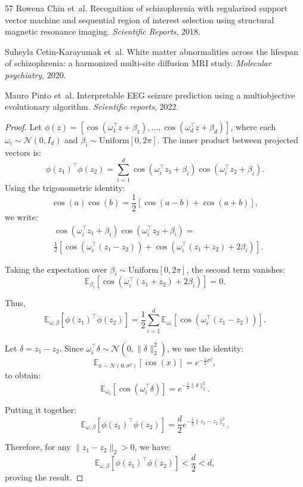 \documentclass{article}
\newtheorem{proof}{Proof}
\begin{document}
\begin{thebibliography}{57}
Rowena Chin et~al.
\newblock Recognition of schizophrenia with regularized support vector machine and sequential region of interest selection using structural magnetic resonance imaging.
\newblock \emph{Scientific Reports}, 2018.

Suheyla Cetin-Karayumak et~al.
\newblock White matter abnormalities across the lifespan of schizophrenia: a harmonized multi-site diffusion {MRI} study.
\newblock \emph{Molecular psychiatry}, 2020.

Mauro Pinto et~al.
\newblock Interpretable {EEG} seizure prediction using a multiobjective evolutionary algorithm.
\newblock \emph{Scientific reports}, 2022.

\end{thebibliography}

\normalsize


\clearpage
\newpage
\appendix

\begin{proof}
Let $\phi(z) = \left[ \cos(\omega_1^\top z + \beta_1), \dots, \cos(\omega_d^\top z + \beta_d) \right]$, where each $\omega_i \sim \mathcal{N}(0, I_d)$ and $\beta_i \sim \mathrm{Uniform}[0, 2\pi]$. The inner product between projected vectors is:
\[
\phi(z_1)^\top \phi(z_2) = \sum_{i=1}^d \cos(\omega_i^\top z_1 + \beta_i) \cos(\omega_i^\top z_2 + \beta_i).
\]
Using the trigonometric identity:
\[
\cos(a)\cos(b) = \frac{1}{2}[\cos(a - b) + \cos(a + b)],
\]
we write:
\begin{align*}
    &\cos(\omega_i^\top z_1 + \beta_i) \cos(\omega_i^\top z_2 + \beta_i) = \\
&\frac{1}{2} \left[ \cos(\omega_i^\top(z_1 - z_2)) + \cos(\omega_i^\top(z_1 + z_2) + 2\beta_i) \right].    
\end{align*}


Taking the expectation over $\beta_i \sim \mathrm{Uniform}[0, 2\pi]$, the second term vanishes:
\[
\mathbb{E}_{\beta_i}[\cos(\omega_i^\top(z_1 + z_2) + 2\beta_i)] = 0.
\]

Thus,
\[
\mathbb{E}_{\omega, \beta}[\phi(z_1)^\top \phi(z_2)] = \frac{1}{2} \sum_{i=1}^d \mathbb{E}_{\omega_i}[\cos(\omega_i^\top(z_1 - z_2))].
\]

Let $\delta = z_1 - z_2$. Since $\omega_i^\top \delta \sim \mathcal{N}(0, \|\delta\|_2^2)$, we use the identity:
\[
\mathbb{E}_{x \sim \mathcal{N}(0, \sigma^2)}[\cos(x)] = e^{-\frac{1}{2}\sigma^2},
\]
to obtain:
\[
\mathbb{E}_{\omega_i}[\cos(\omega_i^\top \delta)] = e^{-\frac{1}{2}\|\delta\|_2^2}.
\]

Putting it together:
\[
\mathbb{E}_{\omega, \beta}[\phi(z_1)^\top \phi(z_2)] = \frac{d}{2} e^{-\frac{1}{2}\|z_1 - z_2\|_2^2}.
\]

Therefore, for any $\|z_1 - z_2\|_2 > 0$, we have:
\[
\mathbb{E}_{\omega, \beta}[\phi(z_1)^\top \phi(z_2)] < \frac{d}{2} < d,
\]
proving the result.
\end{proof}

\clearpage
\newpage
\end{document}

